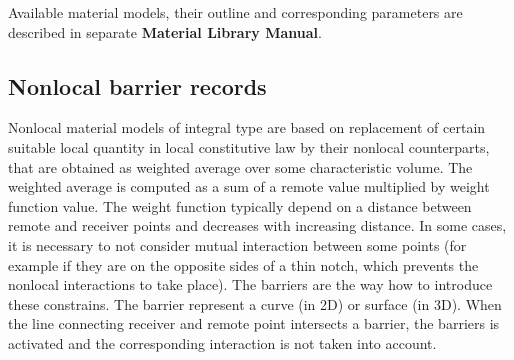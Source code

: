 \documentclass[a4paper]{article}
\begin{document}
Available material models, their outline and
corresponding parameters are described in separate {\bf Material Library Manual}.

\subsection{Nonlocal barrier records}
\label{_NonlocalBarrierRecords}
Nonlocal material models of integral type are based on replacement of
certain suitable local quantity in local constitutive law by their
nonlocal counterparts, that are obtained as weighted average over
some characteristic volume. The weighted average is computed as a sum
of a remote value multiplied by weight function value. The weight
function typically depend on a distance between remote and receiver
points and decreases with increasing distance. In some cases, it is
necessary to not consider mutual interaction between some points (for
example if they are on the opposite sides of a thin notch, which
prevents the nonlocal interactions to take place). The barriers are
the way how to introduce these constrains. The barrier represent a
curve (in 2D) or surface (in 3D). When the line connecting receiver and
remote point intersects a barrier, the barriers is activated and the
corresponding interaction is not taken into account.
\end{document}
